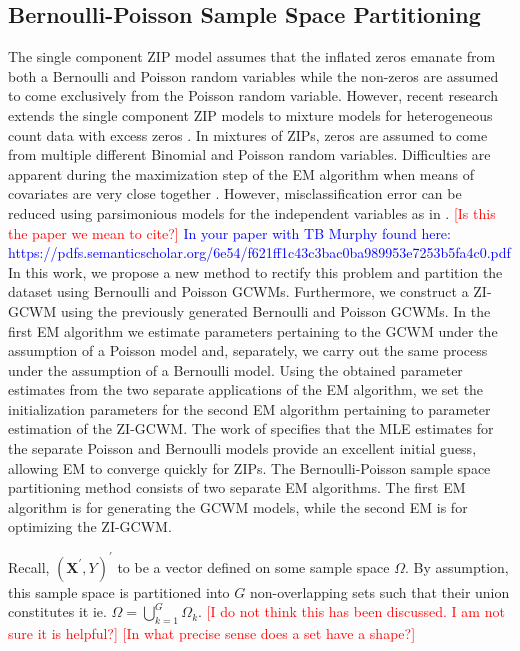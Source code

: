 \documentclass[11pt,letterpaper]{article}
\numberwithin{equation}{section}
\numberwithin{equation}{section}
\numberwithin{equation}{section}
\begin{document}
\subsection{Bernoulli-Poisson Sample Space Partitioning}

The single component ZIP model assumes that the inflated zeros emanate from both a Bernoulli and Poisson random variables while the non-zeros are assumed to come exclusively from the Poisson random variable. However, recent research  extends the single component ZIP models to mixture models for heterogeneous count data with excess zeros \citep[see][]{Bermudez+Karlis:2012}. In mixtures of ZIPs, zeros are assumed to come from multiple different Binomial and Poisson random variables. Difficulties are apparent  during the maximization step of the EM algorithm when means of covariates are very close together \cite[see][]{LimHwa}. However, misclassification error can be reduced using parsimonious models for the independent variables as in  \cite{McNicholas:2010}. \textcolor{red}{[Is this the paper we mean to cite?]} \textcolor{blue}{In your paper with  TB Murphy found here: https://pdfs.semanticscholar.org/6e54/f621ff1c43c3bac0ba989953e7253b5fa4c0.pdf
}
	In this work, we propose a new method to rectify this problem and partition the dataset using Bernoulli and Poisson GCWMs. Furthermore, we construct a ZI-GCWM using the previously generated Bernoulli and Poisson GCWMs. In the first EM algorithm we estimate parameters pertaining to the GCWM under the assumption of a Poisson model and, separately, we carry out the same process under the assumption of a Bernoulli model. Using the obtained parameter estimates from the two separate applications of the EM algorithm, we set the initialization parameters for the second EM algorithm pertaining to parameter estimation of the ZI-GCWM. The work of \cite{Lambert} specifies that the MLE estimates for the separate Poisson and Bernoulli models provide an excellent initial guess, allowing EM to converge quickly for ZIPs. The Bernoulli-Poisson sample space partitioning method consists of two separate EM algorithms. The first EM algorithm is for generating the GCWM models, while the second EM is for optimizing the ZI-GCWM. 
	
	Recall, $(\bm {X^{'}}, Y)^{'}$ to be a vector defined on some sample space $\Omega$.   By assumption, this sample space is partitioned into $G$ non-overlapping sets such that their union constitutes it ie. $ \Omega = \bigcup_{k=1}^G \Omega_k $. \textcolor{red}{[I do not think this has been discussed. I am not sure it is helpful?]}  \textcolor{red}{[In what precise sense does a set have a shape?]} 
	
\end{document}
